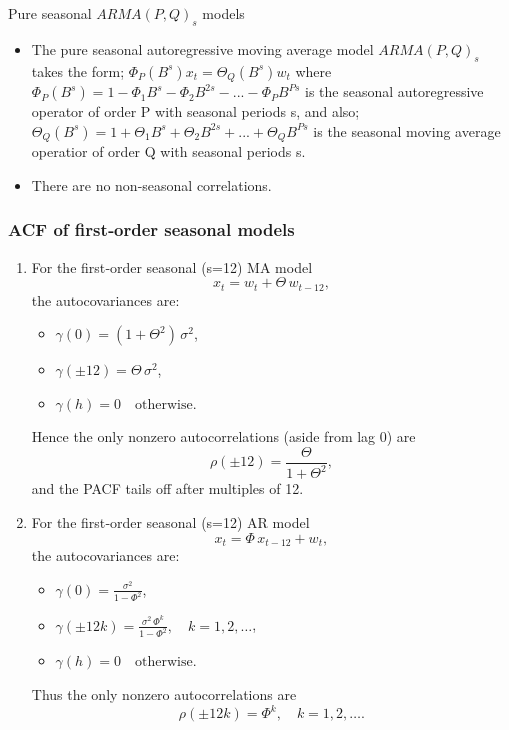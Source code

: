 \documentclass{article}
\begin{document}
\noindent Pure seasonal $ARMA(P,Q)_s$ models
\begin{itemize}
    \item The pure seasonal autoregressive moving average model $ARMA(P,Q)_s$ takes the form;
    \subitem $\Phi_P (B^s)x_t = \Theta_Q(B^s) w_t$ where $\Phi_P(B^s) = 1 - \Phi_1 B^s - \Phi_2 B^{2s} - ... - \Phi_P B^{Ps}$ is the seasonal autoregressive operator of order P with seasonal periods s, and also;
    \subitem $\Theta_Q(B^s) = 1 + \Theta_1 B^s + \Theta_2 B^{2s} + ... + \Theta_Q B^{Ps}$ is the seasonal moving average operatior of order Q with seasonal periods s.
    \item There are no non-seasonal correlations.
\end{itemize}

\subsubsection{ACF of first‐order seasonal models}

\begin{enumerate}
  \item For the first‐order seasonal (s=12) MA model
    \[
      x_t = w_t + \Theta\,w_{t-12},
    \]
    the autocovariances are:
    \begin{itemize}
      \item $\displaystyle \gamma(0) = (1 + \Theta^2)\,\sigma^2$,
      \item $\displaystyle \gamma(\pm 12) = \Theta\,\sigma^2$,
      \item $\gamma(h) = 0\quad\text{otherwise.}$
    \end{itemize}
    Hence the only nonzero autocorrelations (aside from lag 0) are
    \[
      \rho(\pm 12)
        = \frac{\Theta}{1 + \Theta^2},
    \]
    and the PACF tails off after multiples of 12.

  \item For the first‐order seasonal (s=12) AR model
    \[
      x_t = \Phi\,x_{t-12} + w_t,
    \]
    the autocovariances are:
    \begin{itemize}
      \item $\displaystyle \gamma(0) = \frac{\sigma^2}{1 - \Phi^2}$,
      \item $\displaystyle \gamma(\pm 12k)
        = \frac{\sigma^2\,\Phi^k}{1 - \Phi^2},\quad k=1,2,\dots$,
      \item $\gamma(h) = 0\quad\text{otherwise.}$
    \end{itemize}
    Thus the only nonzero autocorrelations are
    \[
      \rho(\pm12k) = \Phi^k,\quad k=1,2,\dots.
    \]
\end{enumerate}
\end{document}
